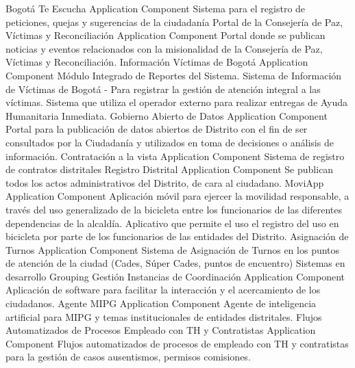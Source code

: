 \documentclass[
	a4paper, %
	12pt, %
]{include/CSSullivanBusinessReport}
\begin{document}
\textbar{} \textbar{} Bogotá Te Escucha \textbar{} Application Component
\textbar{} Sistema para el registro de peticiones, quejas y sugerencias
de la ciudadanía \textbar{} \textbar{} Portal de la Consejería de Paz,
Víctimas y Reconciliación \textbar{} Application Component \textbar{}
Portal donde se publican noticias y eventos relacionados con la
misionalidad de la Consejería de Paz, Víctimas y Reconciliación.
\textbar{} \textbar{} Información Víctimas de Bogotá \textbar{}
Application Component \textbar{} Módulo Integrado de Reportes del
Sistema. Sistema de Información de Víctimas de Bogotá - Para registrar
la gestión de atención integral a las víctimas. Sistema que utiliza el
operador externo para realizar entregas de Ayuda Humanitaria Inmediata.
\textbar{} \textbar{} Gobierno Abierto de Datos \textbar{} Application
Component \textbar{} Portal para la publicación de datos abiertos de
Distrito con el fin de ser consultados por la Ciudadanía y utilizados en
toma de decisiones o análisis de información. \textbar{} \textbar{}
Contratación a la vista \textbar{} Application Component \textbar{}
Sistema de registro de contratos distritales \textbar{} \textbar{}
Registro Distrital \textbar{} Application Component \textbar{} Se
publican todos los actos administrativos del Distrito, de cara al
ciudadano. \textbar{} \textbar{} MoviApp \textbar{} Application
Component \textbar{} Aplicación móvil para ejercer la movilidad
responsable, a través del uso generalizado de la bicicleta entre los
funcionarios de las diferentes dependencias de la alcaldía. Aplicativo
que permite el uso el registro del uso en bicicleta por parte de los
funcionarios de las entidades del Distrito. \textbar{} \textbar{}
Asignación de Turnos \textbar{} Application Component \textbar{} Sistema
de Asignación de Turnos en los puntos de atención de la ciudad (Cades,
Súper Cades, puntos de encuentro) \textbar{} \textbar{} Sistemas en
desarrollo \textbar{} Grouping \textbar{} \textbar{} \textbar{} Gestión
Instancias de Coordinación \textbar{} Application Component \textbar{}
Aplicación de software para facilitar la interacción y el acercamiento
de los ciudadanos. \textbar{} \textbar{} Agente MIPG \textbar{}
Application Component \textbar{} Agente de inteligencia artificial para
MIPG y temas institucionales de entidades distritales. \textbar{}
\textbar{} Flujos Automatizados de Procesos Empleado con TH y
Contratistas \textbar{} Application Component \textbar{} Flujos
automatizados de procesos de empleado con TH y contratistas para la
gestión de casos ausentismos, permisos comisiones. \textbar{} \textbar{}
\end{document}
